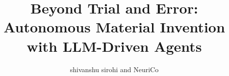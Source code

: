 \documentclass{article}
\title{Beyond Trial and Error: Autonomous Material Invention with LLM-Driven Agents}
\author{shivanshu sirohi and NeuriCo}
\begin{document}
\maketitle

\begin{abstract}

\end{abstract}









\end{document}
